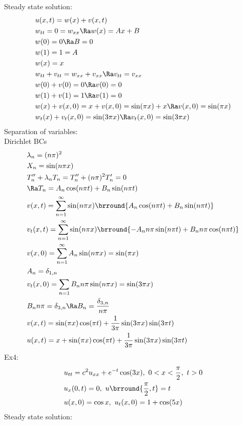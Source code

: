 Steady state solution:
\begin{align*}
    &u(x,t)=w(x)+v(x,t)\\
    &w_{tt}=0=w_{xx}\Ra w(x)=Ax+B\\
    &w(0)=0\Ra B=0\\
    &w(1)=1=A\\
    &w(x)=x\\
    &w_{tt}+v_{tt}=w_{xx}+v_{xx}\Ra v_{tt}=v_{xx}\\
    &w(0)+v(0)=0\Ra v(0)=0\\
    &w(1)+v(1)=1\Ra v(1)=0\\
    &w(x)+v(x,0)=x+v(x,0)=\sin(\pi x)+x\Ra v(x,0)=\sin(\pi x)\\
    &w_t(x)+v_t(x,0)=\sin(3\pi x)\Ra v_t(x,0)=\sin(3\pi x)
\end{align*}
Separation of variables:\\
Dirichlet BCs
\begin{align*}
    &\lambda_n=(n\pi)^2\\
    &X_n=\sin(n\pi x)\\
    &T_n''+\lambda_nT_n=T_n''+(n\pi)^2T_n'=0\\
    &\Ra T_n=A_n\cos(n\pi t)+B_n\sin(n\pi t)\\
    &v(x,t)=\sum_{n=1}^\infty\sin(n\pi x)\brround{A_n\cos(n\pi t)+B_n\sin(n\pi t)}\\
    &v_t(x,t)=\sum_{n=1}^\infty\sin(n\pi x)\brround{-A_nn\pi\sin(n\pi t)+B_nn\pi\cos(n\pi t)}\\
    &v(x,0)=\sum_{n=1}^\infty A_n\sin(n\pi x)=\sin(\pi x)\\
    &A_n=\delta_{1,n}\\
    &v_t(x,0)=\sum_{n=1}B_nn\pi\sin(n\pi x)=\sin(3\pi x)\\
    &B_nn\pi=\delta_{3,n}\Ra B_n=\frac{\delta_{3,n}}{n\pi}\\
    &v(x,t)=\sin(\pi x)\cos(\pi t)+\frac{1}{3\pi}\sin(3\pi x)\sin(3\pi t)\\
    &u(x,t)=x+\sin(\pi x)\cos(\pi t)+\frac{1}{3\pi}\sin(3\pi x)\sin(3\pi t)
\end{align*}
Ex4:
\begin{align*}
    &u_{tt}=c^2u_{xx}+e^{-t}\cos(3x),\ 0<x<\frac{\pi}{2},\ t>0\\
    &u_x(0,t)=0,\ u\brround{\frac{\pi}{2},t}=t\\
    &u(x,0)=\cos x,\ u_t(x,0)=1+\cos(5x)
\end{align*}
Steady state solution:
